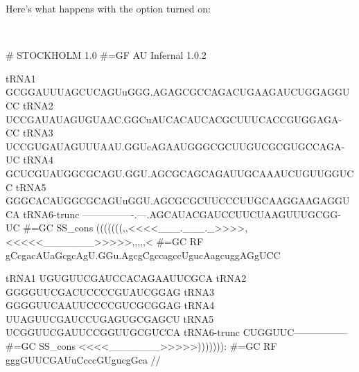 Here's what happens with the  option turned on:

\\

{\samepage
\begin{sreoutput}
# STOCKHOLM 1.0
#=GF AU Infernal 1.0.2

tRNA1        GCGGAUUUAGCUCAGUuGGG.AGAGCGCCAGACUGAAGAUCUGGAGGUCC
tRNA2        UCCGAUAUAGUGUAAC.GGCuAUCACAUCACGCUUUCACCGUGGAGA-CC
tRNA3        UCCGUGAUAGUUUAAU.GGUcAGAAUGGGCGCUUGUCGCGUGCCAGA-UC
tRNA4        GCUCGUAUGGCGCAGU.GGU.AGCGCAGCAGAUUGCAAAUCUGUUGGUCC
tRNA5        GGGCACAUGGCGCAGUuGGU.AGCGCGCUUCCCUUGCAAGGAAGAGGUCA
tRNA6-trunc  ----------------.---.AGCAUACGAUCCUUCUAAGUUUGCGG-UC
#=GC SS_cons (((((((,,<<<<___.___._>>>>,<<<<<_______>>>>>,,,,,<
#=GC RF      gCcgacAUaGcgcAgU.GGu.AgcgCgccagccUgucAagcuggAGgUCC

tRNA1        UGUGUUCGAUCCACAGAAUUCGCA
tRNA2        GGGGUUCGACUCCCCGUAUCGGAG
tRNA3        GGGGUUCAAUUCCCCGUCGCGGAG
tRNA4        UUAGUUCGAUCCUGAGUGCGAGCU
tRNA5        UCGGUUCGAUUCCGGUUGCGUCCA
tRNA6-trunc  CUGGUUC-----------------
#=GC SS_cons <<<<_______>>>>>))))))):
#=GC RF      gggGUUCGAUuCcccGUgucgGca
//
\end{sreoutput}
}

